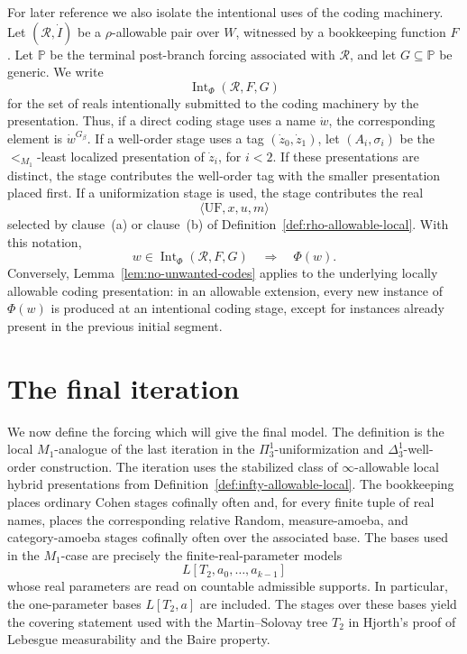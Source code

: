 \documentclass[a4paper,11pt]{article}
\begin{document}
For later reference we also isolate the intentional uses of the coding machinery.
Let \((\mathcal R,\dot I)\) be a \(\rho\)-allowable pair over \(W\), witnessed by a
bookkeeping function \(F\).  Let \(\mathbb P\) be the terminal post-branch forcing
associated with \(\mathcal R\), and let \(G\subseteq\mathbb P\) be generic.
We write
\[
   \operatorname{Int}_\Phi(\mathcal R,F,G)
\]
for the set of reals intentionally submitted to the coding machinery by the
presentation.  Thus, if a direct coding stage uses a name \(\dot w\), the
corresponding element is \(\dot w^{G_\beta}\).  If a well-order stage uses a tag
\((\dot z_0,\dot z_1)\), let \((A_i,\sigma_i)\) be the
\(<_{M_1}\)-least localized presentation of \(\dot z_i\), for \(i<2\).  If these
presentations are distinct, the stage contributes the well-order tag with the
smaller presentation placed first.  If a uniformization stage is used, the stage
contributes the real
\[
   \langle \mathrm{UF},x,u,m\rangle
\]
selected by clause~(a) or clause~(b) of
Definition~\ref{def:rho-allowable-local}.  With this notation,
\[
   w\in\operatorname{Int}_\Phi(\mathcal R,F,G)
   \quad\Longrightarrow\quad
   \Phi(w).
\]
Conversely, Lemma~\ref{lem:no-unwanted-codes} applies to the underlying locally
allowable coding presentation: in an allowable extension, every new instance of
\(\Phi(w)\) is produced at an intentional coding stage, except for instances
already present in the previous initial segment.


\section{The final iteration}
\label{sec:final-iteration}

We now define the forcing which will give the final model.  The definition is
the local $M_1$-analogue of the last iteration in the
$\Pi^1_3$-uniformization and $\Delta^1_3$-well-order construction.  The
iteration uses the stabilized class of $\infty$-allowable local hybrid
presentations from Definition~\ref{def:infty-allowable-local}.  The bookkeeping
places ordinary Cohen stages cofinally often and, for every finite tuple of real
names, places the corresponding relative Random, measure-amoeba, and
category-amoeba stages cofinally often over the associated base.  The bases used
in the $M_1$-case are precisely the finite-real-parameter models
\[
   L[T_2,a_0,\ldots,a_{k-1}]
\]
whose real parameters are read on countable admissible supports.  In particular,
the one-parameter bases $L[T_2,a]$ are included.  The stages over these bases
yield the covering statement used with the Martin--Solovay tree $T_2$ in
Hjorth's proof of Lebesgue measurability and the Baire property.
\end{document}
